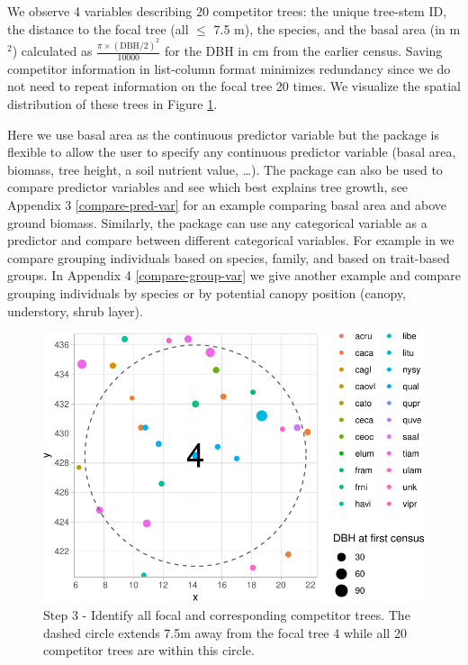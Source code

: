 \documentclass[12pt]{article}
\begin{document}
We observe 4 variables describing 20 competitor trees: the unique
tree-stem ID, the distance to the focal tree (all \(\leq\) 7.5 m), the
species, and the basal area (in m\(^2\)) calculated as
\(\frac{\pi \times (\text{DBH/2})^2}{10000}\) for the DBH in cm from the
earlier census. Saving competitor information in list-column format
minimizes redundancy since we do not need to repeat information on the
focal tree 20 times. We visualize the spatial distribution of these
trees in Figure \ref{fig:scbi-focal-vs-comp-map}.

Here we use basal area as the continuous predictor variable but the
package is flexible to allow the user to specify any continuous
predictor variable (basal area, biomass, tree height, a soil nutrient
value, \dots). The package can also be used to compare predictor
variables and see which best explains tree growth, see Appendix 3
\ref{compare-pred-var} for an example comparing basal area and above
ground biomass. Similarly, the package can use any categorical variable
as a predictor and compare between different categorical variables. For
example in \citet{allen_permutation_2020} we compare grouping
individuals based on species, family, and based on trait-based groups.
In Appendix 4 \ref{compare-group-var} we give another example and
compare grouping individuals by species or by potential canopy position
(canopy, understory, shrub layer).

\begin{figure}

{\centering \includegraphics[width=0.66\linewidth]{Figures/scbi-focal-vs-comp-map-1} 

}

\caption{Step 3 - Identify all focal and corresponding competitor trees. The dashed circle extends 7.5m away from the focal tree 4 while all 20 competitor trees are within this circle.}\label{fig:scbi-focal-vs-comp-map}
\end{figure}
\end{document}
